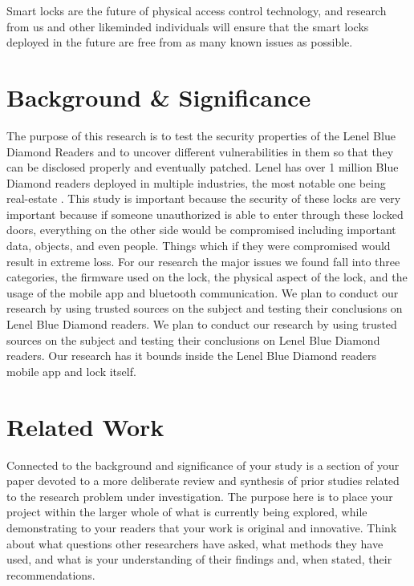 \documentclass[10pt,twocolumn,letterpaper]{article}
\begin{document}
Smart locks are the future of physical access control technology, and research from us and other likeminded individuals will ensure that the smart locks deployed in the future are free from as many known issues as possible.

\section{Background \& Significance}
The purpose of this research is to test the security properties of the Lenel Blue Diamond Readers and to uncover different vulnerabilities in them so that they can be disclosed properly and eventually patched. Lenel has over 1 million Blue Diamond readers deployed in multiple industries, the most notable one being real-estate \cite{lenelbluediamondwebsite}. This study is important because the security of these locks are very important because if someone unauthorized is able to enter through these locked doors, everything on the other side would be compromised including important data, objects, and even people. Things which if they were compromised would result in extreme loss. For our research the major issues we found fall into three categories, the firmware used on the lock, the physical aspect of the lock, and the usage of the mobile app and bluetooth communication. We plan to conduct our research by using trusted sources on the subject and testing their conclusions on Lenel Blue Diamond readers. We plan to conduct our research by using trusted sources on the subject and testing their conclusions on Lenel Blue Diamond readers. Our research has it bounds inside the Lenel Blue Diamond readers mobile app and lock itself.

\section{Related Work}

Connected to the background and significance of your study is a section of your paper devoted to a more deliberate review and synthesis of prior studies related to the research problem under investigation. The purpose here is to place your project within the larger whole of what is currently being explored, while demonstrating to your readers that your work is original and innovative. Think about what questions other researchers have asked, what methods they have used, and what is your understanding of their findings and, when stated, their recommendations.
\end{document}
